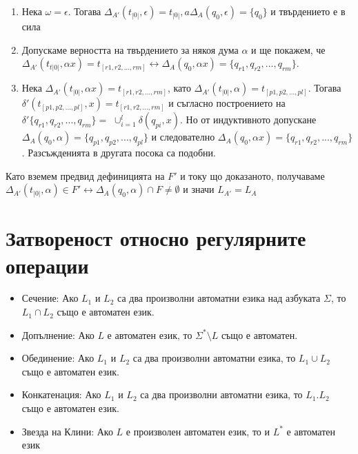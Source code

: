 \documentclass[11pt]{article}
\begin{document}
\renewcommand{\theenumi}{\alph{enumi}}
\begin{enumerate}
	\item Нека $\omega = \epsilon$. Тогава $\Delta_{A'}(t_{|0|}, \epsilon) = t_{|0|}, a \Delta_{A}(q_{0}, \epsilon)= \{q_{0}\}$ и твърдението е в сила
	\item Допускаме верността на твърдението за някоя дума $\alpha$  и ще покажем, че $\Delta_{A'}(t_{t|0|}, \alpha x) = t_{[r1, r2, ..., rm]} \leftrightarrow \Delta_{A}(q_{0}, \alpha x) = 			\{q_{r1}, q_{r2}, ..., q_{rm}\}$.
	\item Нека $\Delta_{A'}(t_{|0|}, \alpha x) = t_{[r1, r2, ..., rm]}$, като
		$\Delta_{A'}(t_{|0|}, \alpha) = t_{[p1, p2, ..., pl]}$. Тогава $\delta'(t_{[p1, p2, ..., pl]}, x) = t_{[r1, r2, ...,rm]}$ и съгласно построението на $\delta'\{q_{r1}, q_{r2}, 				..., q_{rm} \} = $
		$\cup_{i=1}^{l}\delta(q_{pi}, x).$ Но от индуктивното допускане 
		$\Delta_{A}(q_{0}, \alpha) = \{q_{p1}, q_{p2}, ..., q_{pl}\} $ и следователно 
		$\Delta_{A}(q_{0}, \alpha x) = \{q_{r1}, q_{r2}, ..., q_{rm} \}$. Разсъжденията в другата посока са подобни.
\end{enumerate} \par

Като вземем предвид дефиницията на $F'$ и току що доказаното, получаваме $\Delta_{A'}(t_{|0|}, \alpha) \in F' \leftrightarrow 
\Delta_{A}(q_{0}, \alpha) \cap F \neq \emptyset$ и значи 
$L_{A'} = L_{A}$   

\section{Затвореност относно регулярните операции}
\begin{itemize}[noitemsep]
	\item Сечение: Ако $L_{1}$ и $L_{2}$ са два произволни автоматни езика над азбуката $\Sigma$, то $L_{1}\cap L_{2}$ също е автоматен език.
	\item Допълнение: Ако $L$ е автоматен език, то $\Sigma^{*}\setminus L$ също е автоматен.
	\item Обединение: Ако $L_{1}$ и $L_{2}$ са два произволни автоматни езика, то $L_{1}\cup L_{2}$ също е автоматен език.
	\item Конкатенация: Ако $L_{1}$ и $L_{2}$ са два произволни автоматни езика, то $L_{1}. L_{2}$ също е автоматен език.
	\item Звезда на Клини: Ако $L$ е произволен автоматен език, то и $L^{*}$ е автоматен език
\end{itemize}
\end{document}
